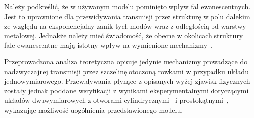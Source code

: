 Należy podkreślić, że w używanym modelu pominięto wpływ fal ewanescentnych. Jest to uprawnione dla przewidywania transmisji przez strukturę w polu dalekim ze względu na eksponencjalny zanik tych modów wraz z odległością od warstwy metalowej. Jednakże należy mieć świadomość, że obecne w okolicach struktury fale ewanescentne mają istotny wpływ na wymienione mechanizmy~\cite{ebbesen1998extraordinary}.

Przeprowadzona analiza teoretyczna opisuje jedynie mechanizmy prowadzące do nadzwyczajnej transmisji przez szczelinę otoczoną rowkami w przypadku układu jednowymiarowego. Przewidywania płynące z opisanych wyżej zjawisk fizycznych zostały jednak poddane weryfikacji z wynikami eksperymentalnymi dotyczącymi układów dwuwymiarowych z otworami cylindrycznymi~\cite{ebbesen1998extraordinary} i prostokątnymi~\cite{koerkamp2004strong}, wykazując możliwość uogólnienia przedstawionego modelu.

